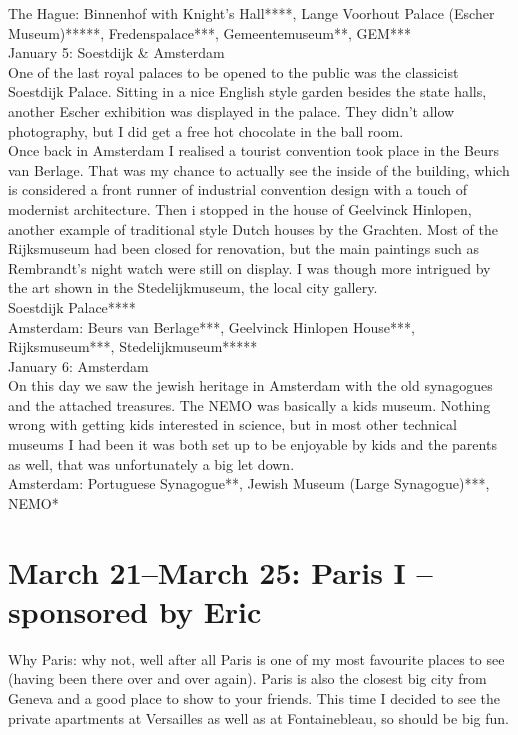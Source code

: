 The Hague: Binnenhof with Knight's Hall****, Lange Voorhout Palace (Escher Museum)*****, Fredenspalace***, Gemeentemuseum**, GEM***\\

January 5: Soestdijk \& Amsterdam\\
One of the last royal palaces to be opened to the public was the classicist Soestdijk Palace. Sitting in a nice English style garden besides the state halls, another Escher exhibition was displayed in the palace. They didn't allow photography, but I did get a free hot chocolate in the ball room.\\
Once back in Amsterdam I realised a tourist convention took place in the Beurs van Berlage. That was my chance to actually see the inside of the building, which is considered a front runner of industrial convention design with a touch of modernist architecture. Then i stopped in the house of Geelvinck Hinlopen, another example of traditional style Dutch houses by the Grachten. Most of the Rijksmuseum had been closed for renovation, but the main paintings such as Rembrandt's night watch were still on display. I was though more intrigued by the art shown in the Stedelijkmuseum, the local city gallery.\\

Soestdijk Palace****\\
Amsterdam: Beurs van Berlage***, Geelvinck Hinlopen House***, Rijksmuseum***, Stedelijkmuseum*****\\

January 6: Amsterdam\\
On this day we saw the jewish heritage in Amsterdam with the old synagogues and the attached treasures. The NEMO was basically a kids museum. Nothing wrong with getting kids interested in science, but in most other technical museums I had been it was both set up to be enjoyable by kids and the parents as well, that was unfortunately a big let down.\\

Amsterdam: Portuguese Synagogue**, Jewish Museum (Large Synagogue)***, NEMO*

\section{March 21--March 25: Paris I -- sponsored by Eric}
\label{2013:ParisI}

Why Paris: why not, well after all Paris is one of my most favourite places to see (having been there over and over again). Paris is also the closest big city from Geneva and a good place to show to your friends. This time I decided to see the private apartments at Versailles as well as at Fontainebleau, so should be big fun. 

